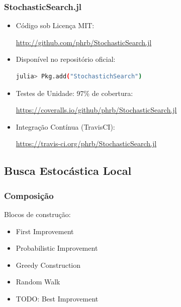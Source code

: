 \documentclass[10pt, compress]{beamer}
\begin{document}
\begin{frame}[fragile]
    \frametitle{StochasticSearch.jl}
    \begin{itemize}
        \item Código sob Licença MIT:

            \url{http://github.com/phrb/StochasticSearch.jl}
        \item Disponível no \alert{repositório oficial}:
            \begin{lstlisting}[language=bash]
julia> Pkg.add("StochastichSearch")
            \end{lstlisting}
        \item Testes de Unidade: \alert{97\%} de cobertura:

                \url{https://coveralls.io/github/phrb/StochasticSearch.jl}
        \item Integração Contínua (\alert{TravisCI}):

            \url{https://travis-ci.org/phrb/StochasticSearch.jl}
    \end{itemize}
\end{frame}

\subsection{Busca Estocástica Local}

\begin{frame}[fragile]
    \frametitle{Composição}
    Blocos de construção:
    \begin{itemize}
        \item First Improvement
        \item Probabilistic Improvement
        \item Greedy Construction
        \item Random Walk
        \item \alert{TODO}: Best Improvement
    \end{itemize}
\end{frame}
\end{document}
